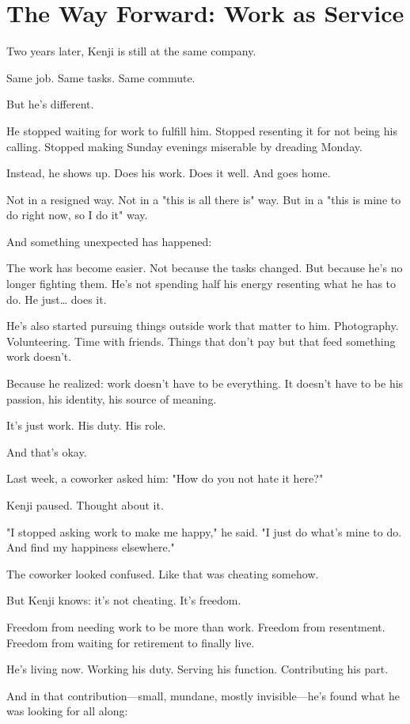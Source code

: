 \documentclass[11pt,twoside]{book}
\begin{document}
\section*{The Way Forward: Work as Service}

Two years later, Kenji is still at the same company.

Same job. Same tasks. Same commute.

But he's different.

He stopped waiting for work to fulfill him. Stopped resenting it for not being his calling. Stopped making Sunday evenings miserable by dreading Monday.

Instead, he shows up. Does his work. Does it well. And goes home.

Not in a resigned way. Not in a "this is all there is" way. But in a "this is mine to do right now, so I do it" way.

And something unexpected has happened:

The work has become easier. Not because the tasks changed. But because he's no longer fighting them. He's not spending half his energy resenting what he has to do. He just\ldots{} does it.

He's also started pursuing things outside work that matter to him. Photography. Volunteering. Time with friends. Things that don't pay but that feed something work doesn't.

Because he realized: work doesn't have to be everything. It doesn't have to be his passion, his identity, his source of meaning.

It's just work. His duty. His role.

And that's okay.

Last week, a coworker asked him: "How do you not hate it here?"

Kenji paused. Thought about it.

"I stopped asking work to make me happy," he said. "I just do what's mine to do. And find my happiness elsewhere."

The coworker looked confused. Like that was cheating somehow.

But Kenji knows: it's not cheating. It's freedom.

Freedom from needing work to be more than work. Freedom from resentment. Freedom from waiting for retirement to finally live.

He's living now. Working his duty. Serving his function. Contributing his part.

And in that contribution—small, mundane, mostly invisible—he's found what he was looking for all along:
\end{document}
